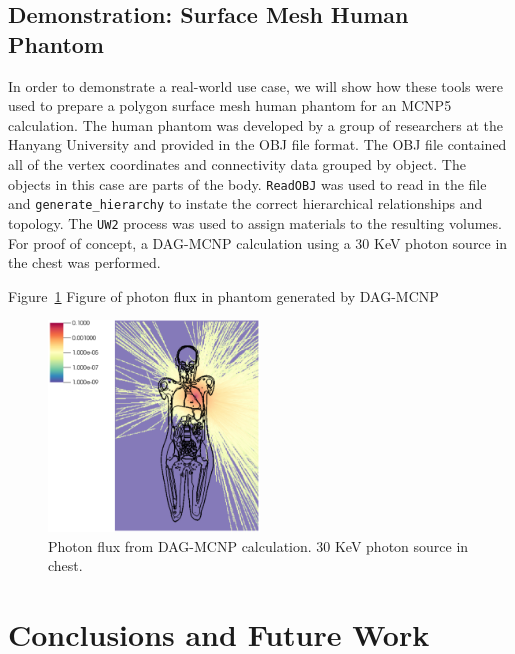 \documentclass{anstrans}
\begin{document}
\subsection{Demonstration: Surface Mesh Human Phantom}
In order to demonstrate a real-world use case, we will show how these tools were used to prepare
a polygon surface mesh human phantom for an MCNP5 calculation.  The human phantom was
developed by a group of researchers at the Hanyang University and provided in the OBJ file format.
The OBJ file contained all of the vertex coordinates and connectivity data grouped by object.
The objects in this case are parts of the body.
\texttt{ReadOBJ} was used to read in the file and \texttt{generate\_hierarchy} to instate the correct 
hierarchical relationships and topology.  The \texttt{UW2} process was used to assign materials to
the resulting volumes.  For proof of concept, a DAG-MCNP calculation using a 30 KeV photon
source in the chest was performed.  

Figure~\ref{fig:mcnp} Figure of photon flux in phantom generated by DAG-MCNP
\begin{figure}[ht] %
  \centering
  \includegraphics[width=0.5\textwidth]{../figs/30KeV_Psource.png}
  \caption{Photon flux from DAG-MCNP calculation. 30 KeV photon source in chest. }
  \label{fig:mcnp}
\end{figure}


\section{Conclusions and Future Work}
\end{document}
